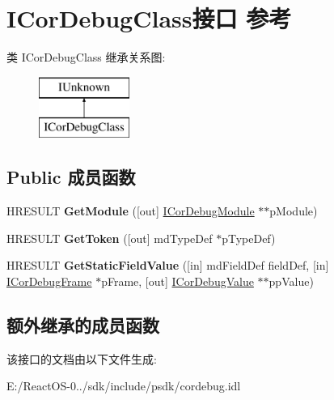 \hypertarget{interface_i_cor_debug_class}{}\section{I\+Cor\+Debug\+Class接口 参考}
\label{interface_i_cor_debug_class}
类 I\+Cor\+Debug\+Class 继承关系图\+:\begin{figure}[H]
\begin{center}
\leavevmode
\includegraphics[height=2.000000cm]{interface_i_cor_debug_class}
\end{center}
\end{figure}
\subsection*{Public 成员函数}
\begin{DoxyCompactItemize}
\item 
\mbox{\label{interface_i_cor_debug_class_afec6af4f59d48a43eadd22c2f7bbae04}} 
H\+R\+E\+S\+U\+LT {\bfseries Get\+Module} (\mbox{[}out\mbox{]} \hyperlink{interface_i_cor_debug_module}{I\+Cor\+Debug\+Module} $\ast$$\ast$p\+Module)
\item 
\mbox{\label{interface_i_cor_debug_class_a2053782f42c382d386b19af0610fa9a9}} 
H\+R\+E\+S\+U\+LT {\bfseries Get\+Token} (\mbox{[}out\mbox{]} md\+Type\+Def $\ast$p\+Type\+Def)
\item 
\mbox{\label{interface_i_cor_debug_class_a2855179a29f59fd4e65992f82912a189}} 
H\+R\+E\+S\+U\+LT {\bfseries Get\+Static\+Field\+Value} (\mbox{[}in\mbox{]} md\+Field\+Def field\+Def, \mbox{[}in\mbox{]} \hyperlink{interface_i_cor_debug_frame}{I\+Cor\+Debug\+Frame} $\ast$p\+Frame, \mbox{[}out\mbox{]} \hyperlink{interface_i_cor_debug_value}{I\+Cor\+Debug\+Value} $\ast$$\ast$pp\+Value)
\end{DoxyCompactItemize}
\subsection*{额外继承的成员函数}


该接口的文档由以下文件生成\+:\begin{DoxyCompactItemize}
\item 
E\+:/\+React\+O\+S-\/0../sdk/include/psdk/cordebug.\+idl\end{DoxyCompactItemize}
